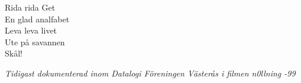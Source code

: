 \vspace{10pt}
Rida rida Get\\
En glad analfabet\\
Leva leva livet\\
Ute på savannen\\
Skål!\par
\vspace{10pt}
{\footnotesize\textit{Tidigast dokumenterad inom Datalogi Föreningen Västerås i filmen n0llning -99}}
